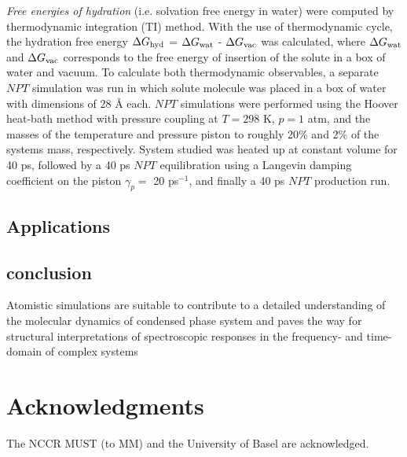 \documentclass[journal=jacsat,manuscript=article]{achemso}
\begin{document}
{\it Free energies of hydration} (i.e. solvation free energy in water)
were computed by thermodynamic integration (TI) method. With the use
of thermodynamic cycle, the hydration free energy $\Delta G_{\rm hyd}$
= $\Delta G_{\rm wat}$ - $\Delta G_{\rm vac}$ was calculated, where
$\Delta G_{\rm wat}$ and $\Delta G_{\rm vac}$ corresponds to the free
energy of insertion of the solute in a box of water and vacuum. To
calculate both thermodynamic observables, a separate $NPT$ simulation
was run in which solute molecule was placed in a box of water with
dimensions of 28 \AA\/ each.  $NPT$ simulations were performed using
the Hoover heat-bath method with pressure coupling\cite{feller1995} at
$T = 298$ K, $p = 1$ atm, and the masses of the temperature and
pressure piston to roughly 20\% and 2\% of the systems mass,
respectively. System studied was heated up at constant volume for 40
ps, followed by a 40 ps $NPT$ equilibration using a Langevin damping
coefficient on the piston $\gamma_p=$ 20 ps$^{-1}$, and finally a 40
ps $NPT$ production run.\\
 
\subsection{Applications}
%   
%   
%   
%   
%   
%

\subsection{conclusion}
Atomistic simulations are suitable to contribute to a detailed
understanding of the molecular dynamics of condensed phase system and
paves the way for structural interpretations of spectroscopic
responses in the frequency- and time-domain of complex systems

\section*{Acknowledgments}
The NCCR MUST (to MM) and the University of Basel are acknowledged.



\end{document}
